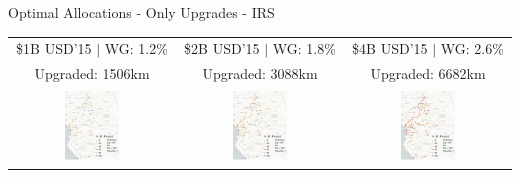 \documentclass[aspectratio=169,xcolor=dvipsnames]{beamer}
\begin{document}
\begin{frame}[label=IOU_IRS]{Optimal Allocations - Only Upgrades - IRS \quad \hyperlink{EXPOU_IRS}{} \ \hyperlink{IOU}{}}
\vspace{-1mm}
\begin{adjustbox}{center}
\begin{tabular}{@{}c@{}|@{}c@{}|@{}c@{}} 
\$1B USD'15 $|$ WG: 1.2\% & \$2B USD'15 $|$ WG: 1.8\% & \$4B USD'15 $|$ WG: 2.6\%  \\
Upgraded: 1506km & Upgraded: 3088km & Upgraded: 6682km \\ 
\includegraphics[width=0.38\textwidth, trim= {0.9cm 0 0.9cm 0}, clip]{"../figures/GE/trans_africa_network_GE_20g_1b_fixed_cgc_irs_sigma3.8_rho0_julia_MACR_90kmh_google_perc_ug.pdf"} & 
\includegraphics[width=0.38\textwidth, trim= {0.9cm 0 0.9cm 0}, clip]{"../figures/GE/trans_africa_network_GE_20g_2b_fixed_cgc_irs_sigma3.8_rho0_julia_MACR_90kmh_google_perc_ug.pdf"} &
\includegraphics[width=0.38\textwidth, trim= {0.9cm 0 0.9cm 0}, clip]{"../figures/GE/trans_africa_network_GE_20g_4b_fixed_cgc_irs_sigma3.8_rho0_julia_MACR_90kmh_google_perc_ug.pdf"}  
\end{tabular}
\end{adjustbox}
\end{frame}
\end{document}
